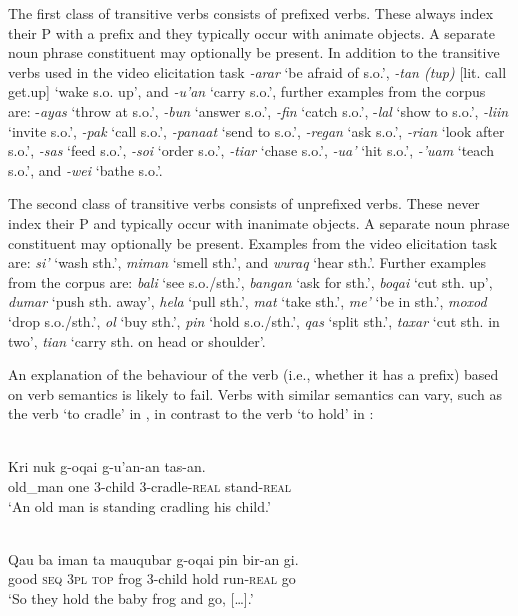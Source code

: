 The first class of transitive verbs consists of prefixed verbs. These always index their P with a prefix and they typically occur with animate objects. A separate noun phrase constituent may optionally be present. In addition to the transitive verbs used in the video elicitation task \textit{{}-arar} `be afraid of s.o.', \textit{{}-tan (tup)} [lit. call get.up] `wake s.o. up', and \textit{{}-u'an} `carry s.o.', further examples from the corpus are: -\textit{ayas} `throw at s.o.', \textit{{}-bun} `answer s.o.', \textit{{}-fin} `catch s.o.', -\textit{lal} `show to s.o.', \textit{{}-liin} `invite s.o.', \textit{{}-pak} `call s.o.', \textit{{}-panaat} `send to s.o.', \textit{{}-regan} `ask s.o.', \textit{{}-rian} `look after s.o.', \textit{{}-sas} `feed s.o.', \textit{{}-soi} `order s.o.', \textit{{}-tiar} `chase s.o.', \textit{{}-ua'} `hit s.o.', \textit{{}-'uam} `teach s.o.', and \textit{{}-wei} `bathe s.o.'. 

The second class of transitive verbs consists of unprefixed verbs. These never index their P and typically occur with inanimate objects. A separate noun phrase constituent may optionally be present. Examples from the video elicitation task are: \textit{si'} `wash sth.', \textit{miman} `smell sth.', and \textit{wuraq} `hear sth.'. Further examples from the corpus are: \textit{bali} `see s.o./sth.', \textit{bangan} `ask for sth.', \textit{boqai} `cut sth. up', \textit{dumar} `push sth. away', \textit{hela} `pull sth.', \textit{mat} `take sth.', \textit{me'} `be in sth.', \textit{moxod} `drop s.o./sth.', \textit{ol} `buy sth.', \textit{pin} `hold s.o./sth.', \textit{qas} `split sth.', \textit{taxar} `cut sth. in two', \textit{tian} `carry sth. on head or shoulder'.

An explanation of the behaviour of the verb (i.e., whether it has a prefix) based on verb semantics is likely to fail. Verbs with similar semantics can vary, such as the verb `to cradle' in , in contrast to the verb `to hold' in :


\ea 
\label{ex:1244}
 \\ 
 \gll    Kri  nuk  g-oqai  g-u'an-an  tas-an.\\
  old\_man  one  3-child  3-cradle-\textsc{real} stand-\textsc{real}  \\
 \glt `An old man is standing cradling his child.'
\z
 
\ea 
\label{ex:1245}
 \\ 
 \gll   Qau  ba  iman  ta    mauqubar  g-oqai  pin  bir-an  gi.\\
    good  \textsc{seq}  \textsc{3pl}  \textsc{top}  frog  3-child  hold  run-\textsc{real}  go \\
 \glt  `So they hold the baby frog and go, [{\dots}].' 
\z

